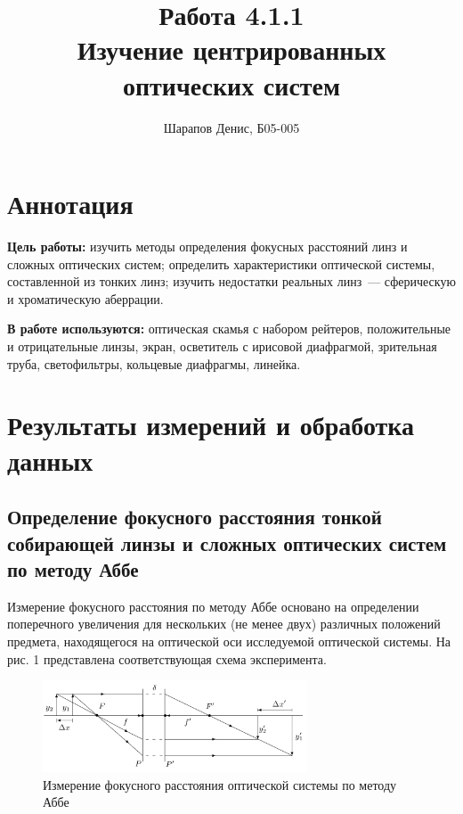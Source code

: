 \documentclass[a4paper]{article}
\title{Работа 4.1.1 \\ Изучение центрированных оптических систем}
\author{Шарапов Денис, Б05-005}
\date{}
\begin{document}
    \maketitle
    \tableofcontents
    \newpage
    
\section{Аннотация}

\noindent\textbf{Цель работы:} изучить методы определения фокусных расстояний линз и сложных оптических систем; определить характеристики оптической системы, составленной из тонких линз; изучить недостатки реальных линз~--- сферическую и хроматическую аберрации. \smallskip
 
\noindent \textbf{В работе используются:} оптическая скамья с набором рейтеров, положительные и отрицательные линзы, экран, осветитель с ирисовой диафрагмой, зрительная труба, светофильтры, кольцевые диафрагмы, линейка.

\section{Результаты измерений и обработка данных}

\subsection{Определение фокусного расстояния тонкой собирающей линзы и сложных оптических систем по методу Аббе}

Измерение фокусного расстояния по методу Аббе основано на определении поперечного увеличения для нескольких (не менее двух) различных положений предмета, находящегося на оптической оси исследуемой оптической системы. На рис. 1 представлена соответствующая
схема эксперимента.

\begin{figure}[ht!]
    \centering
    \includegraphics[width = 0.7\textwidth]{image/pic1.png}
    \caption{Измерение фокусного расстояния оптической
    системы по методу Аббе}
\end{figure}
\end{document}
